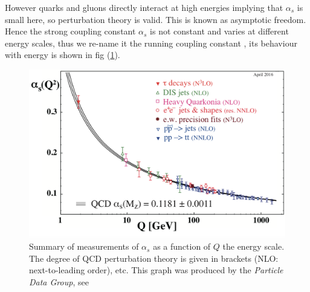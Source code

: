 \documentclass[12pt, onecolumn, nofootinbib]{revtex4}    %
\begin{document}
However quarks and gluons directly interact at high energies implying that ${\alpha_s}$ is small here, so perturbation theory is valid. This is known as asymptotic freedom. Hence the strong coupling constant ${\alpha _s}$ is not constant and varies at different energy scales, thus we re-name it the running coupling constant \cite{BOOK}, its behaviour with energy is shown in fig (\ref{allas}). 
\begin{figure} 
	\begin{center}
		\includegraphics[width=1 \textwidth]{as_allq.jpg}
		\caption{Summary of measurements of ${\alpha_s}$ as a function of ${Q}$ the energy scale. The degree of QCD perturbation theory is given in brackets (NLO: next-to-leading order), etc. This graph was produced by the \textit{Particle Data Group}, see \cite{PPB}}
		\label{allas}
	\end{center}
\end{figure}
\end{document}

